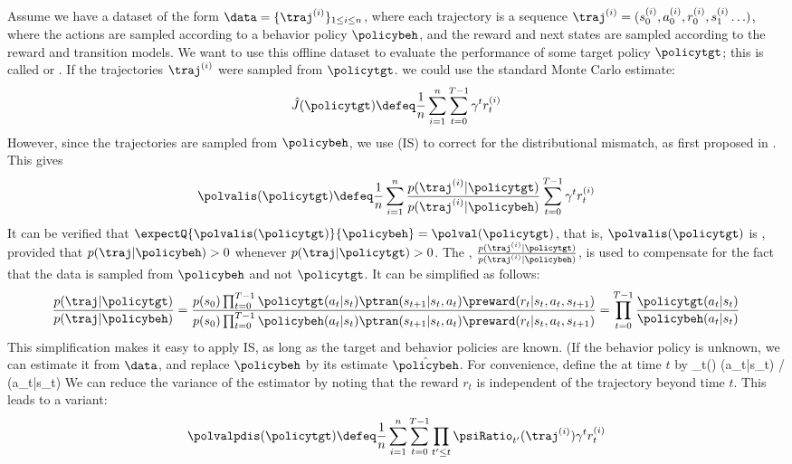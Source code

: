 Assume we have a dataset of the form
$\data = \{\traj^{(i)}\}_{1 \le i \le n}$, where each trajectory is a sequence
$\traj^{(i)}=(s_0^{(i)},a_0^{(i)},r_0^{(i)},s_1^{(i)}\ldots)$,
where the actions are sampled according to a behavior policy
$\policybeh$, and
the reward and next states are sampled
according to the reward and transition models.
We want to use this offline dataset to evaluate the performance of some
target policy $\policytgt$;
this is called  or .
If the trajectories $\traj^{(i)}$ were sampled from $\policytgt$.
we could use the standard Monte Carlo estimate:
\begin{align}
  \hat{J}(\policytgt)
\defeq \frac{1}{n} \sum_{i=1}^n  \sum_{t=0}^{T-1} \gamma^t r_t^{(i)}
\end{align}
However, since the trajectories are sampled from $\policybeh$,
we use  (IS)
to correct for the distributional mismatch,
as first proposed in \citep{Precup2000}.
This gives
\begin{align}
\label{eqn:offpolicyrl-basicis}
  \polvalis(\policytgt)
  \defeq \frac{1}{n} \sum_{i=1}^n
  \frac{p(\traj^{(i)}|\policytgt)}{p(\traj^{(i)}|\policybeh)}
  \sum_{t=0}^{T-1} \gamma^t r_t^{(i)}
\end{align}
It can be verified that $\expectQ{\polvalis(\policytgt)}{\policybeh}
= \polval(\policytgt)$, that is, $\polvalis(\policytgt)$ is ,
provided that $p(\traj|\policybeh)>0$
whenever $p(\traj|\policytgt)>0$.
The ,
$\frac{p(\traj^{(i)}|\policytgt)}{p(\traj^{(i)}|\policybeh)}$,
is used to compensate for the fact that
the data is sampled from $\policybeh$ and not $\policytgt$.
It can be simplified as follows:
\begin{align}
\label{eqn:offpolicyrl-isratio}
\frac{p(\traj|\policytgt)}{p(\traj|\policybeh)}
= \frac{p(s_0) \prod_{t=0}^{T-1} \policytgt(a_t|s_t) \ptran(s_{t+1}|s_t,a_t) \preward(r_t|s_t,a_t,s_{t+1})}{p(s_0) \prod_{t=0}^{T-1} \policybeh(a_t|s_t) \ptran(s_{t+1}|s_t,a_t) \preward(r_t|s_t,a_t,s_{t+1})}
= \prod_{t=0}^{T-1} \frac{\policytgt(a_t|s_t)}{\policybeh(a_t|s_t)}
\end{align}
This simplification makes it easy to apply IS,
as long as the target and behavior policies are known.
(If the behavior policy is unknown,
we can estimate it from $\data$,  and replace $\policybeh$
by its estimate $\hat{\policybeh}$.
For convenience, define the
 at time $t$ by
\be
\psiRatio_t(\traj)  \policytgt(a_t|s_t) / \policybeh(a_t|s_t)
\ee
We can reduce the variance of the estimator
by noting that the reward $r_t$ is independent of the trajectory
beyond time $t$.
This leads to a  variant:
\begin{align}
\label{eqn:offpolicyrl-pdis}
  \polvalpdis(\policytgt)
  \defeq \frac{1}{n} \sum_{i=1}^n \sum_{t=0}^{T-1}
  \prod_{t' \le t} \psiRatio_{t'}(\traj^{(i)}) \gamma^t r_t^{(i)}
\end{align}

